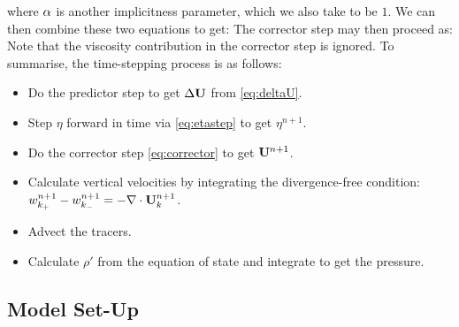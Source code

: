 where $\alpha$ is another implicitness parameter, which we also take to be $1$. We can then combine these two equations to get:
The corrector step may then proceed as:
Note that the viscosity contribution in the corrector step is ignored.
To summarise, the time-stepping process is as follows:
\begin{itemize}
	\item Do the predictor step to get $\Delta\mathbf{U}$ from \cref{eq:deltaU}.
	\item Step $\eta$ forward in time via  \cref{eq:etastep} to get $\eta^{n+1}$.
	\item Do the corrector step \cref{eq:corrector} to get $\mathbf{U}^{n+1}$. 
	\item Calculate vertical velocities by integrating the divergence-free condition: $w_{k_+}^{n+1} - w_{k_-}^{n+1} = -\nabla\cdot\mathbf{U}^{n+1}_{k}$.
	\item Advect the tracers.
	\item Calculate $\rho'$ from the equation of state and integrate to get the pressure.
\end{itemize}

\subsection{Model Set-Up} \label{sec:fesomsetup}

